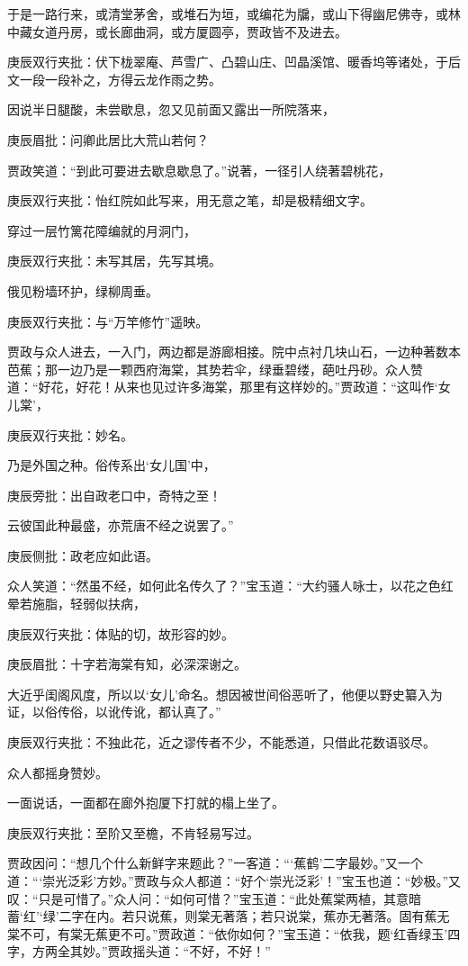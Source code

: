 \begin{parag}


    于是一路行来，或清堂茅舍，或堆石为垣，或编花为牖，或山下得幽尼佛寺，或林中藏女道丹房，或长廊曲洞，或方厦圆亭，贾政皆不及进去。\begin{note}庚辰双行夹批：伏下栊翠庵、芦雪广、凸碧山庄、凹晶溪馆、暖香坞等诸处，于后文一段一段补之，方得云龙作雨之势。\end{note}因说半日腿酸，未尝歇息，忽又见前面又露出一所院落来，\begin{note}庚辰眉批：问卿此居比大荒山若何？\end{note}贾政笑道：“到此可要进去歇息歇息了。”说著，一径引人绕著碧桃花，\begin{note}庚辰双行夹批：怡红院如此写来，用无意之笔，却是极精细文字。\end{note}穿过一层竹篱花障编就的月洞门，\begin{note}庚辰双行夹批：未写其居，先写其境。\end{note}俄见粉墙环护，绿柳周垂。\begin{note}庚辰双行夹批：与“万竿修竹”遥映。\end{note}贾政与众人进去，一入门，两边都是游廊相接。院中点衬几块山石，一边种著数本芭蕉；那一边乃是一颗西府海棠，其势若伞，绿垂碧缕，葩吐丹砂。众人赞道：“好花，好花！从来也见过许多海棠，那里有这样妙的。”贾政道：“这叫作‘女儿棠’，\begin{note}庚辰双行夹批：妙名。\end{note}乃是外国之种。俗传系出‘女儿国’中，\begin{note}庚辰旁批：出自政老口中，奇特之至！\end{note}云彼国此种最盛，亦荒唐不经之说罢了。”\begin{note}庚辰侧批：政老应如此语。\end{note}众人笑道：“然虽不经，如何此名传久了？”宝玉道：“大约骚人咏士，以花之色红晕若施脂，轻弱似扶病，\begin{note}庚辰双行夹批：体贴的切，故形容的妙。\end{note}\begin{note}庚辰眉批：十字若海棠有知，必深深谢之。\end{note}大近乎闺阁风度，所以以‘女儿’命名。想因被世间俗恶听了，他便以野史纂入为证，以俗传俗，以讹传讹，都认真了。”\begin{note}庚辰双行夹批：不独此花，近之谬传者不少，不能悉道，只借此花数语驳尽。\end{note}众人都摇身赞妙。
\end{parag}


\begin{parag}


    一面说话，一面都在廊外抱厦下打就的榻上坐了。\begin{note}庚辰双行夹批：至阶又至檐，不肯轻易写过。\end{note}贾政因问：“想几个什么新鲜字来题此？”一客道：“‘蕉鹤’二字最妙。”又一个道：“‘崇光泛彩’方妙。”贾政与众人都道：“好个‘崇光泛彩’！”宝玉也道：“妙极。”又叹：“只是可惜了。”众人问：“如何可惜？”宝玉道：“此处蕉棠两植，其意暗蓄‘红’‘绿’二字在内。若只说蕉，则棠无著落；若只说棠，蕉亦无著落。固有蕉无棠不可，有棠无蕉更不可。”贾政道：“依你如何？”宝玉道：“依我，题‘红香绿玉’四字，方两全其妙。”贾政摇头道：“不好，不好！”
\end{parag}


